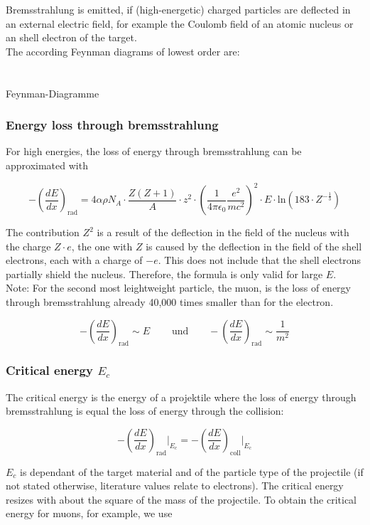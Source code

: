 Bremsstrahlung is emitted, if (high-energetic) charged particles are deflected in an external
electric field, for example the Coulomb field of an atomic nucleus or an shell electron of the
target.
\\
The according Feynman diagrams of lowest order are:
\\
\\
\\
Feynman-Diagramme

\subsubsection*{Energy loss through bremsstrahlung}

For high energies, the loss of energy through bremsstrahlung can be approximated with

\[-\left(\frac{dE}{dx}\right)_{\text{rad}} = 4\alpha \rho N_A \cdot \frac{Z(Z+1)}{A} \cdot z^2\cdot
\left(\frac{1}{4\pi \epsilon_0} \frac{e^2}{mc^2} \right)^2 \cdot E\cdot \text{ln}(183\cdot
Z^{-\frac{1}{3}}) \]

The contribution $Z^2$ is a result of the deflection in the field of the nucleus with the charge
$Z\cdot e$, the one with $Z$ is caused by the deflection in the field of the shell electrons, each
with a charge of $-e$. This does not include that the shell electrons partially shield the nucleus.
Therefore, the formula is only valid for large $E$.
\\
Note: For the second most leightweight particle, the muon, is the loss of energy through
bremsstrahlung already 40,000 times smaller than for the electron.

\[-\left(\frac{dE}{dx}\right)_{\text{rad}} \sim E~~~~~~~~~~\text{und}~~~~~~~~~
-\left(\frac{dE}{dx}\right)_{\text{rad}} \sim \frac{1}{m^2}\]

\subsubsection*{Critical energy $E_c$}

The critical energy is the energy of a projektile where the loss of energy through bremsstrahlung
is equal the loss of energy through the collision:

\[-\left(\frac{dE}{dx}\right)_{\text{rad}} \bigg|_{E_c} = -\left(\frac{dE}{dx}\right)_{\text{coll}}
\bigg|_{E_c}  \]

$E_c$ is dependant of the target material and of the particle type of the projectile (if not
stated otherwise, literature values relate to electrons). The critical energy resizes with about the
square of the mass of the projectile. To obtain the critical energy for muons, for example, we use

